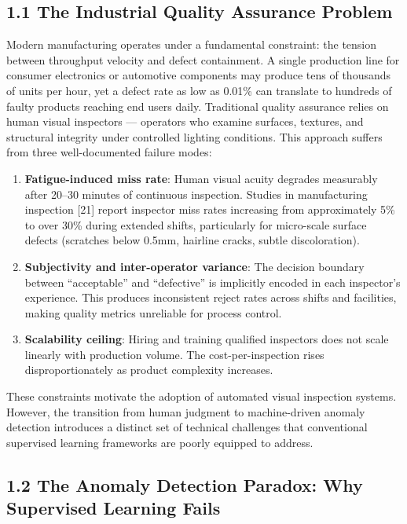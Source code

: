 \subsection{1.1 The Industrial Quality Assurance Problem}\label{the-industrial-quality-assurance-problem}

Modern manufacturing operates under a fundamental constraint: the tension between throughput velocity and defect containment. A single production line for consumer electronics or automotive components may produce tens of thousands of units per hour, yet a defect rate as low as 0.01\% can translate to hundreds of faulty products reaching end users daily. Traditional quality assurance relies on human visual inspectors --- operators who examine surfaces, textures, and structural integrity under controlled lighting conditions. This approach suffers from three well-documented failure modes:

\begin{enumerate}
\def\labelenumi{\arabic{enumi}.}
\item
  \textbf{Fatigue-induced miss rate}: Human visual acuity degrades measurably after 20--30 minutes of continuous inspection. Studies in manufacturing inspection {[}21{]} report inspector miss rates increasing from approximately 5\% to over 30\% during extended shifts, particularly for micro-scale surface defects (scratches below 0.5mm, hairline cracks, subtle discoloration).
\item
  \textbf{Subjectivity and inter-operator variance}: The decision boundary between ``acceptable'' and ``defective'' is implicitly encoded in each inspector's experience. This produces inconsistent reject rates across shifts and facilities, making quality metrics unreliable for process control.
\item
  \textbf{Scalability ceiling}: Hiring and training qualified inspectors does not scale linearly with production volume. The cost-per-inspection rises disproportionately as product complexity increases.
\end{enumerate}

These constraints motivate the adoption of automated visual inspection systems. However, the transition from human judgment to machine-driven anomaly detection introduces a distinct set of technical challenges that conventional supervised learning frameworks are poorly equipped to address.

\subsection{1.2 The Anomaly Detection Paradox: Why Supervised Learning Fails}\label{the-anomaly-detection-paradox-why-supervised-learning-fails}

